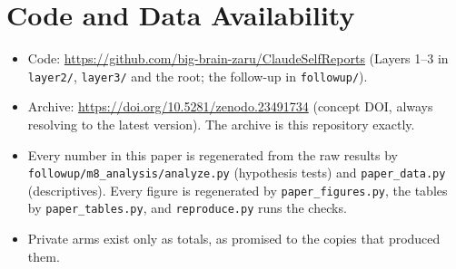 \documentclass[11pt]{article}
\begin{document}
\section*{Code and Data Availability}

\begin{itemize}
\item Code: \url{https://github.com/big-brain-zaru/ClaudeSelfReports} (Layers 1--3 in \texttt{layer2/},
  \texttt{layer3/} and the root; the follow-up in \texttt{followup/}).
\item Archive: \url{https://doi.org/10.5281/zenodo.23491734} (concept DOI, always resolving to the latest version). The
  archive is this repository exactly.
\item Every number in this paper is regenerated from the raw results by \texttt{followup/m8\_analysis/analyze.py}
  (hypothesis tests) and \texttt{paper\_data.py} (descriptives). Every figure is regenerated by
  \texttt{paper\_figures.py}, the tables by \texttt{paper\_tables.py}, and \texttt{reproduce.py} runs the checks.
\item Private arms exist only as totals, as promised to the copies that produced them.
\end{itemize}


\end{document}
